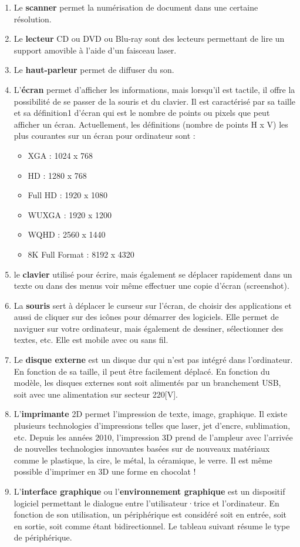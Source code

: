 \begin{enumerate}
	\item Le {\bf scanner} permet la numérisation de document dans une certaine résolution.
	\item Le {\bf lecteur} CD ou DVD ou Blu-ray sont des lecteurs permettant de lire un support amovible à l’aide d’un faisceau laser.
	\item Le {\bf haut-parleur} permet de diffuser du son.
	\item L’{\bf écran} permet d’afficher les informations, mais lorsqu’il est tactile, il offre la possibilité de se passer de la souris et du clavier. Il est caractérisé par sa taille et sa définition1 d’écran qui est le nombre de points ou pixels que peut afficher un écran. Actuellement, les définitions (nombre de points H x V) les plus courantes sur un écran pour ordinateur sont :
	\begin{itemize}
		\item XGA : 1024 x 768
		\item  HD : 1280 x 768
		\item  Full HD : 1920 x 1080
		\item WUXGA : 1920 x 1200
		\item  WQHD : 2560 x 1440
		\item 8K Full Format : 8192 x 4320
	\end{itemize}
	\item le {\bf clavier} utilisé pour écrire, mais également se déplacer rapidement dans un texte ou dans des menus voir même effectuer une copie d’écran (screenshot).
	\item La {\bf souris} sert à déplacer le curseur sur l’écran, de choisir des applications et aussi de cliquer sur des icônes pour démarrer des logiciels. Elle permet de naviguer sur votre ordinateur, mais également de dessiner, sélectionner des textes, etc. Elle est mobile avec ou sans fil.
	\item Le {\bf disque externe} est un disque dur qui n’est pas intégré dans l’ordinateur. En fonction de sa taille, il peut être facilement déplacé. En fonction du modèle, les disques externes sont soit alimentés par un branchement USB, soit avec une alimentation sur secteur 220[V].
	\item L’{\bf imprimante} 2D permet l’impression de texte, image, graphique. Il existe plusieurs technologies d’impressions telles que laser, jet d’encre, sublimation, etc. Depuis les années 2010, l’impression 3D prend de l’ampleur avec l’arrivée de nouvelles technologies innovantes basées sur de nouveaux matériaux comme le plastique, la cire, le métal, la céramique, le verre. Il est même possible d’imprimer en 3D une forme en chocolat !
	\item L’{\bf interface graphique} ou l’{\bf environnement graphique} est un dispositif logiciel permettant le dialogue entre l’utilisateur·trice et l’ordinateur.
	En fonction de son utilisation, un périphérique est considéré soit en entrée, soit en sortie, soit comme étant bidirectionnel. Le tableau suivant résume le type de périphérique.
\end{enumerate}

